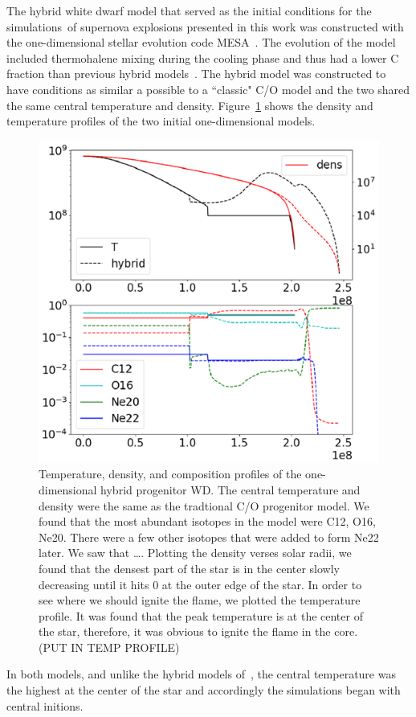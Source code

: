 \documentclass[iop,apj]{emulateapj}
\begin{document}
The hybrid white dwarf model that served as the initial conditions 
for the simulations of supernova explosions presented in this work
was constructed with the one-dimensional stellar evolution code 
MESA~\citep{mesa1,mesa2,mesa3,mesa3e}. The evolution of the model 
included thermohalene mixing during the cooling phase and thus
had a lower C fraction than previous hybrid models~\citep{brooksetal2017}.
The hybrid model was constructed to have conditions as similar a possible
to a ``classic" C/O model and the two shared the same central temperature
and density.  Figure~\ref{fig:init_conds} shows the density and temperature
profiles of the two initial one-dimensional models. 
\begin{figure}
\includegraphics[width=\columnwidth]{figures/initial_conds.png}
\caption{\label{fig:init_conds}
Temperature, density, and  composition profiles of the one-dimensional hybrid 
progenitor WD. The central temperature and density were the same as
the tradtional C/O progenitor model. 
 We found that the most abundant isotopes in the model were C12, O16, Ne20. There were a few other isotopes that were added to form Ne22 later. We saw that  ….
Plotting the density verses solar radii, we found that the densest part of the star is in the center slowly decreasing until it hits 0 at the outer edge of the star. 
In order to see where we should ignite the flame, we plotted the temperature profile. It was found that the peak temperature is at the center of the star, therefore, it was obvious to ignite the flame in the core. (PUT IN TEMP PROFILE)
}
\end{figure}
In both models, and unlike the hybrid models of~\citet{willcoxetal2016}, the central
temperature was the highest at the center of the star and accordingly the simulations 
began with central initions. 
\end{document}
